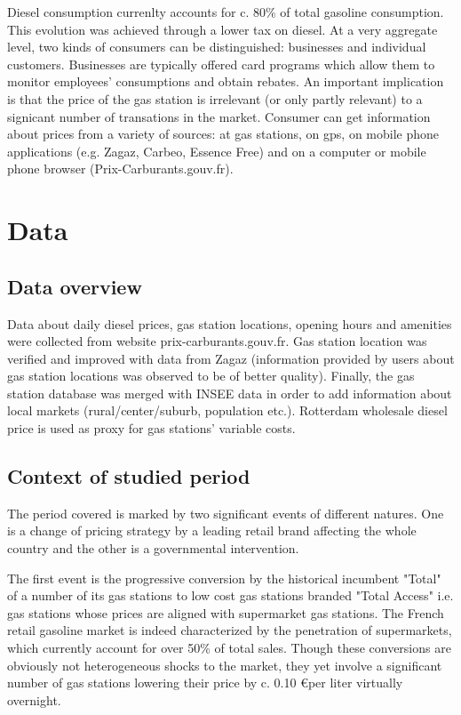 \documentclass[11pt]{article}
\begin{document}
Diesel consumption currenlty accounts for c. 80\% of total gasoline consumption. This evolution was achieved through a lower tax on diesel. At a very aggregate level, two kinds of consumers can be distinguished: businesses and individual customers. Businesses are typically offered card programs which allow them to monitor employees' consumptions and obtain rebates. An important implication is that the price of the gas station is irrelevant (or only partly relevant) to a signicant number of transations in the market.
Consumer can get information about prices from a variety of sources: at gas stations, on gps, on mobile phone applications (e.g. Zagaz, Carbeo, Essence Free) and on a computer or mobile phone browser (Prix-Carburants.gouv.fr).

\section{Data}

\subsection{Data overview}

Data about daily diesel prices, gas station locations, opening hours and amenities were collected from website prix-carburants.gouv.fr. Gas station location was verified and improved with data from Zagaz (information provided by users about gas station locations was observed to be of better quality). Finally, the gas station database was merged with INSEE data in order to add information about local markets (rural/center/suburb, population etc.). Rotterdam wholesale diesel price is used as proxy for gas stations' variable costs.

\subsection{Context of studied period}

The period covered is marked by two significant events of different natures. One is a change of pricing strategy by a leading retail brand affecting the whole country and the other is a governmental intervention.

The first event is the progressive conversion by the historical incumbent "Total" of a number of its gas stations to low cost gas stations branded "Total Access" i.e. gas stations whose prices are aligned with supermarket gas stations. The French retail gasoline market is indeed characterized by the penetration of supermarkets, which currently account for over 50\% of total sales. Though these conversions are obviously not heterogeneous shocks to the market, they yet involve a significant number of gas stations lowering their price by c. 0.10 \euro per liter virtually overnight.
\end{document}

